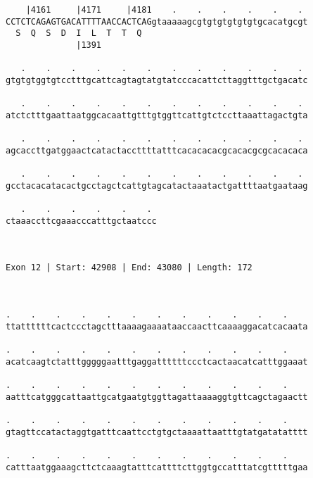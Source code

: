 \documentclass{article}
\begin{document}
\begin{Verbatim}
    |4161     |4171     |4181    .    .    .    .    .    . 
CCTCTCAGAGTGACATTTTAACCACTCAGgtaaaaagcgtgtgtgtgtgtgcacatgcgt
  S  Q  S  D  I  L  T  T  Q                                 
              |1391                                         
  
   .    .    .    .    .    .    .    .    .    .    .    . 
gtgtgtggtgtcctttgcattcagtagtatgtatcccacattcttaggtttgctgacatc
                                                            
   .    .    .    .    .    .    .    .    .    .    .    . 
atctctttgaattaatggcacaattgtttgtggttcattgtctccttaaattagactgta
                                                            
   .    .    .    .    .    .    .    .    .    .    .    . 
agcaccttgatggaactcatactaccttttatttcacacacacgcacacgcgcacacaca
                                                            
   .    .    .    .    .    .    .    .    .    .    .    . 
gcctacacatacactgcctagctcattgtagcatactaaatactgattttaatgaataag
                                                            
   .    .    .    .    .    . 
ctaaaccttcgaaacccatttgctaatccc
                              
                              
 
Exon 12 | Start: 42908 | End: 43080 | Length: 172



.    .    .    .    .    .    .    .    .    .    .    .    
ttattttttcactccctagctttaaaagaaaataaccaacttcaaaaggacatcacaata
                                                            
.    .    .    .    .    .    .    .    .    .    .    .    
acatcaagtctatttgggggaatttgaggattttttccctcactaacatcatttggaaat
                                                            
.    .    .    .    .    .    .    .    .    .    .    .    
aatttcatgggcattaattgcatgaatgtggttagattaaaaggtgttcagctagaactt
                                                            
.    .    .    .    .    .    .    .    .    .    .    .    
gtagttccatactaggtgatttcaattcctgtgctaaaattaatttgtatgatatatttt
                                                            
.    .    .    .    .    .    .    .    .    .    .    .    
catttaatggaaagcttctcaaagtatttcattttcttggtgccatttatcgtttttgaa
                                                            

\end{Verbatim}
\end{document}
